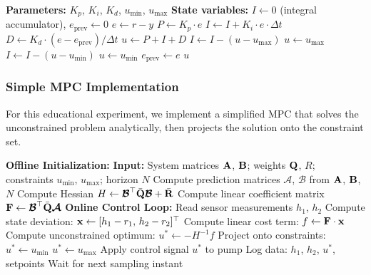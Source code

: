\begin{algorithm}[H]
\caption{PID Controller with Anti-Windup}
\label{alg:pid_tank}
\begin{algorithmic}[1]
\State \textbf{Parameters:} $K_p$, $K_i$, $K_d$, $u_{\min}$, $u_{\max}$
\State \textbf{State variables:} $I \gets 0$ (integral accumulator), $e_{\text{prev}} \gets 0$
\State
{} 
    \State $e \gets r - y$ 
    \State $P \gets K_p \cdot e$ 
    \State $I \gets I + K_i \cdot e \cdot \Delta t$ 
    \State $D \gets K_d \cdot (e - e_{\text{prev}}) / \Delta t$ 
    \State $u \gets P + I + D$ 
        \State $I \gets I - (u - u_{\max})$ 
        \State $u \gets u_{\max}$
        \State $I \gets I - (u - u_{\min})$ 
        \State $u \gets u_{\min}$
    \EndIf
    \State $e_{\text{prev}} \gets e$
    \State \Return $u$
\EndFunction
\end{algorithmic}
\end{algorithm}

\subsubsection{Simple MPC Implementation}

For this educational experiment, we implement a simplified MPC that solves the unconstrained problem analytically, then projects the solution onto the constraint set.

\begin{algorithm}[H]
\caption{Simplified MPC for Two-Tank System}
\label{alg:mpc_tank}
\begin{algorithmic}[1]
\State \textbf{Offline Initialization:}
\State \textbf{Input:} System matrices $\mathbf{A}$, $\mathbf{B}$; weights $\mathbf{Q}$, $R$; constraints $u_{\min}$, $u_{\max}$; horizon $N$
\State Compute prediction matrices $\boldsymbol{\mathcal{A}}$, $\boldsymbol{\mathcal{B}}$ from $\mathbf{A}$, $\mathbf{B}$, $N$
\State Compute Hessian $H \gets \boldsymbol{\mathcal{B}}^\top \bar{\mathbf{Q}} \boldsymbol{\mathcal{B}} + \bar{\mathbf{R}}$
\State Compute linear coefficient matrix $\mathbf{F} \gets \boldsymbol{\mathcal{B}}^\top \bar{\mathbf{Q}} \boldsymbol{\mathcal{A}}$
\State
\State \textbf{Online Control Loop:}
    \State Read sensor measurements $h_1$, $h_2$
    \State Compute state deviation: $\mathbf{x} \gets [h_1 - r_1, \, h_2 - r_2]^\top$
    \State Compute linear cost term: $f \gets \mathbf{F} \cdot \mathbf{x}$
    \State Compute unconstrained optimum: $u^* \gets -H^{-1} f$
    \State Project onto constraints:
        \State $u^* \gets u_{\min}$
        \State $u^* \gets u_{\max}$
    \EndIf
    \State Apply control signal $u^*$ to pump
    \State Log data: $h_1$, $h_2$, $u^*$, setpoints
    \State Wait for next sampling instant
\EndWhile
\end{algorithmic}
\end{algorithm}


